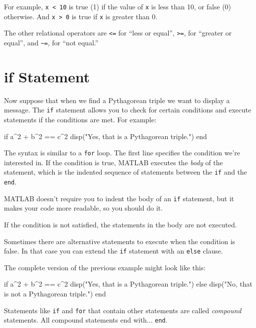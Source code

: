 For example, {\tt x < 10} is true (1) if the value of {\tt x} is less than 10, or false (0) otherwise.  And {\tt x > 0} is true if {\tt x} is greater than 0.

The other relational operators are {\tt <=} for ``less or equal'', {\tt >=}, for ``greater or equal'', and  \verb+~=+, for ``not equal.''


\section{if Statement}


Now suppose that when we find a Pythagorean triple we want to display a message.
The {\tt if} statement allows you to check for certain conditions
and execute statements if the conditions are met.  For example:

\begin{code}
if a^2 + b^2 == c^2
    disp("Yes, that is a Pythagorean triple.")
end
\end{code}

The syntax is similar to a {\tt for} loop.  The first line
specifies the condition we're interested in.  If the condition is true, 
MATLAB executes the {\em body} of the statement, which is the indented sequence of
statements between the {\tt if} and the {\tt end}.


MATLAB doesn't require you to indent the body of an {\tt if}
statement, but it makes your code more readable, so you should do it.

If the condition is not satisfied, the statements in the body are
not executed. 

Sometimes there are alternative statements to
execute when the condition is false.  In that case you can extend
the {\tt if} statement with an {\tt else} clause.


The complete version of the previous example might look like this:

\begin{code}
if a^2 + b^2 == c^2
    disp("Yes, that is a Pythagorean triple.")
else
    disp("No, that is not a Pythagorean triple.")
end
\end{code}

Statements like {\tt if} and {\tt for} that contain other statements
are called \emph{compound} statements.  All compound statements end
with... {\tt end}.

